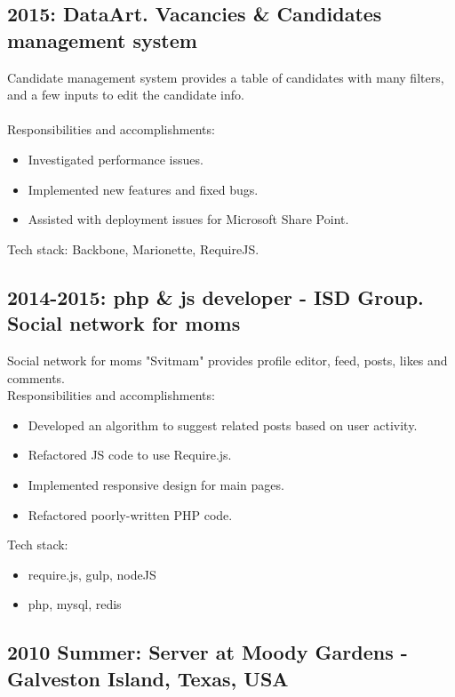 \documentclass[a4paper, 14pt]{article}
\begin{document}
  \subsection{2015: DataArt. Vacancies \& Candidates management system}
  Candidate management system provides a table of candidates with many filters, and a few inputs to edit the candidate info. \\
  \\
  Responsibilities and accomplishments:
    \begin{itemize}
      \item Investigated performance issues. \\
      \item Implemented new features and fixed bugs. \\
      \item Assisted with deployment issues for Microsoft Share Point.
    \end{itemize}
    \bigskip
    Tech stack: Backbone, Marionette, RequireJS.

  \subsection{2014-2015: php \& js developer - ISD Group. Social network for moms}
    Social network for moms "Svitmam" provides profile editor, feed, posts, likes and comments.
  \\
  Responsibilities and accomplishments:
  \begin{itemize}
    \item Developed an algorithm to suggest related posts based on user activity. \\
    \item Refactored JS code to use Require.js. \\
    \item Implemented responsive design for main pages. \\
    \item Refactored poorly-written PHP code.
  \end{itemize}
  \bigskip
  Tech stack:
  \begin{itemize}
    \item require.js, gulp, nodeJS \\
    \item php, mysql, redis
  \end{itemize}

  \subsection{2010 Summer: Server at Moody Gardens - Galveston Island, Texas, USA}
\end{document}
